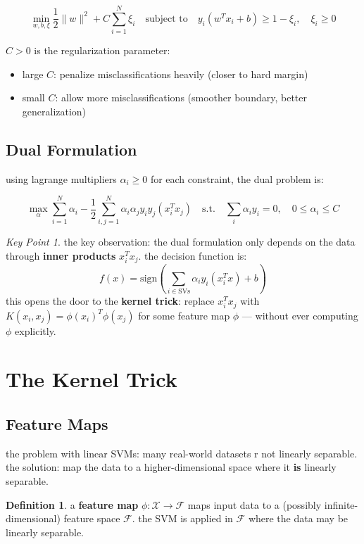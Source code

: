 \documentclass[11pt,a4paper]{article}
\theoremstyle{definition}
\newtheorem{definition}{Definition}[section]
\theoremstyle{remark}
\newtheorem*{keypoint}{Key Point}
\begin{document}
\[
\min_{w, b, \xi} \frac{1}{2}\|w\|^2 + C\sum_{i=1}^N \xi_i \quad \text{subject to} \quad y_i(w^T x_i + b) \geq 1 - \xi_i, \quad \xi_i \geq 0
\]

$C > 0$ is the regularization parameter:
\begin{itemize}
    \item large $C$: penalize misclassifications heavily (closer to hard margin)
    \item small $C$: allow more misclassifications (smoother boundary, better generalization)
\end{itemize}

\subsection{Dual Formulation}

using lagrange multipliers $\alpha_i \geq 0$ for each constraint, the dual problem is:

\[
\boxed{\max_\alpha \sum_{i=1}^N \alpha_i - \frac{1}{2}\sum_{i,j=1}^N \alpha_i \alpha_j y_i y_j (x_i^T x_j) \quad \text{s.t.} \quad \sum_i \alpha_i y_i = 0, \quad 0 \leq \alpha_i \leq C}
\]

\begin{keypoint}
the key observation: the dual formulation only depends on the data through \textbf{inner products} $x_i^T x_j$. the decision function is:
\[
f(x) = \text{sign}\left(\sum_{i \in \text{SVs}} \alpha_i y_i (x_i^T x) + b\right)
\]
this opens the door to the \textbf{kernel trick}: replace $x_i^T x_j$ with $K(x_i, x_j) = \phi(x_i)^T \phi(x_j)$ for some feature map $\phi$ --- without ever computing $\phi$ explicitly.
\end{keypoint}

\section{The Kernel Trick}

\subsection{Feature Maps}

the problem with linear SVMs: many real-world datasets r not linearly separable. the solution: map the data to a higher-dimensional space where it \textbf{is} linearly separable.

\begin{definition}
a \textbf{feature map} $\phi: \mathcal{X} \to \mathcal{F}$ maps input data to a (possibly infinite-dimensional) feature space $\mathcal{F}$. the SVM is applied in $\mathcal{F}$ where the data may be linearly separable.
\end{definition}
\end{document}
